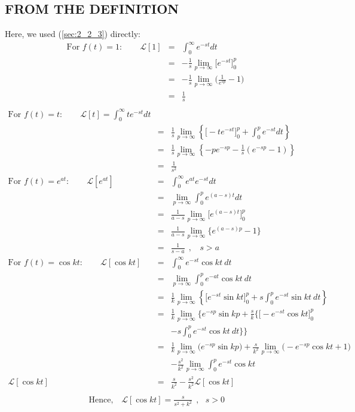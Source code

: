 \documentclass[11pt]{report}
\newcommand{\Laplace}{\mathcal{L}}
\newcommand{\ft}{f(t)}
\newcommand{\sbracket}[1]{\left[#1\right]}
\newcommand{\LFn}[1]{\Laplace \sbracket{#1}}
\newcommand{\sps}{\\[0.2cm]}
\newcommand{\spn}[1]{\\[#1cm]}
\newcommand{\dsp}{\displaystyle}
\begin{document}
	\subsection{FROM THE DEFINITION}
	Here, we used (\ref{sec:2_2_3}) directly:
	\begin{eqnarray*}
		\text{For } \ft = 1:\qquad  \dsp\LFn{1} &=& \int_0^\infty e^{-st}dt \\
		&=& -\dsp\frac{1}{s}\lim\limits_{p\rightarrow\infty}\Big[e^{-st}\Big]_0^p\\
		&=&-\dsp\frac{1}{s}\lim\limits_{p\rightarrow\infty}\Big(\dsp\frac{1}{e^{sp}}-1\Big)\\
		&=& \dsp \frac{1}{s}\sps
	\end{eqnarray*}
	\begin{eqnarray*}
		\text{For } \ft = t:\qquad  \dsp\LFn{t} =\int_0^\infty te^{-st}dt\\
		&=& \dsp\frac{1}{s}\lim\limits_{p\rightarrow\infty}\left\{ \Big[-te^{-st}\Big]_0^p + \int_0^pe^{-st}dt\right\}\\
		&=&\dsp\frac{1}{s}\lim\limits_{p\rightarrow\infty}\left\{ -pe^{-sp} - \frac{1}{s}\left(e^{-sp} - 1\right)    \right\}\\
		&=&\dsp\frac{1}{s^2}\spn{.6}
		\text{For } \ft = \dsp e^{at}:\qquad  \dsp\LFn{e^{at}} &=& \int_0^\infty e^{at}e^{-st}dt\\
		&=& \lim\limits_{p\rightarrow\infty}\int_0^p e^{(a-s)t}dt\\
		&=&\frac{1}{a-s}\lim\limits_{p\rightarrow\infty}\Big[e^{(a-s)t}\Big]_0^p\\
		&=&\frac{1}{a-s}\lim\limits_{p\rightarrow\infty}\Big\{e^{(a-s)p}-1\Big\}\\
		&=& \frac{1}{s-a}~~, ~~~~ s > a\spn{.6}
		\text{For } \ft = \dsp \cos kt:\qquad  \dsp\LFn{\cos kt} &=& \int_0^\infty e^{-st}\cos kt~dt\\
		&=&\lim\limits_{p\rightarrow\infty}\int_0^p e^{-at}\cos kt~dt\\
		&=& \frac{1}{k}\lim\limits_{p\rightarrow\infty}\left\{ \Big[e^{-st}\sin kt\Big]_0^p + s\int_0^p e^{-st}\sin kt~dt \right\}\\
		&=& \frac{1}{k}\lim\limits_{p\rightarrow\infty}\Big\{ e^{-sp}\sin kp + \frac{s}{k}\Big\{ \Big[-e^{-st}\cos kt\Big]_0^p\\ 
		&&- s\int_0^p e^{-st}\cos kt~ dt \Big\}  \Big\}\\
		&=&\frac{1}{k}\lim\limits_{p\rightarrow\infty}\Big(e^{-sp}\sin kp \Big) + \frac{s}{k^2}\lim\limits_{p\rightarrow\infty}\Big(-e^{-sp}\cos kt + 1\Big)\\ 
		&&- \frac{s^2}{k^2}\lim\limits_{p\rightarrow\infty}\int_0^p e^{-st}\cos kt\\
		\Laplace[\cos kt]&=&\frac{s}{k^2}-\frac{s^2}{k^2}\Laplace[\cos kt]\\
	\end{eqnarray*}
	\begin{eqnarray*}
		\text{ Hence, }~~~ \LFn{\cos kt} = \frac{s}{s^2 + k^2}~~, ~~~ s > 0
	\end{eqnarray*}
	
\end{document}
